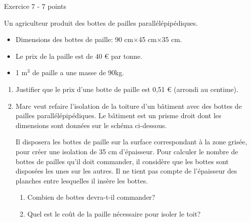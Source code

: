 
%
\begin{h2}Exercice 7 - 7 points\end{h2}
Un agriculteur produit des bottes de pailles parallélépipédiques.
\begin{itemize}
     \item
     Dimensions des bottes de paille: 90 cm$\times $45 cm$\times $35 cm.
\begin{center}
\end{center}
     \item
     Le prix de la paille est de 40 € par tonne.
     \item
     1 m$^{3}$ de paille a une masse de 90kg.
\end{itemize}
\begin{enumerate}
     \item
     Justifier que le prix d'une botte de paille est 0,51 € (arrondi au centime).
     \item
     Marc veut refaire l'isolation de la toiture d'un bâtiment avec des bottes de pailles parallélépipédiques. Le bâtiment est un prisme droit dont les dimensions sont données sur le schéma ci-dessous.
     \par
     Il disposera les bottes de paille sur la surface correspondant à la zone grisée, pour créer une isolation de 35 cm d'épaisseur. Pour calculer le nombre de bottes de pailles qu'il doit commander, il considère que les bottes sont disposées les unes sur les autres. Il ne tient pas compte de l'épaisseur des planches entre lesquelles il insère les bottes.

\begin{center}
\end{center}
     \begin{enumerate}[label=\alph*.]
          \item
          Combien de bottes devra-t-il commander?
          \item
     Quel est le coût de la paille nécessaire pour isoler le toit?\end{enumerate}
\end{enumerate}
